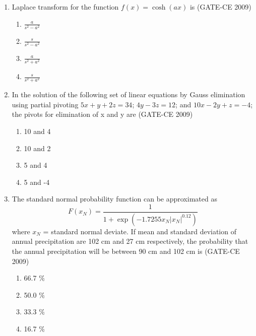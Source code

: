\documentclass[journal,12pt,onecolumn]{article}
\theoremstyle{remark}
\begin{document}
\begin{enumerate}
    \item Laplace transform for the function $f(x)=\cosh(ax)$ is (GATE-CE 2009)
    \begin{multicols}{2}
    \begin{enumerate}
        \item $\frac{a}{s^2-a^2}$ 
        \item $\frac{s}{s^2-a^2}$ 
        \item $\frac{a}{s^2+a^2}$ 
        \item $\frac{s}{s^2+a^2}$
    \end{enumerate}
    \end{multicols}
    
    \item In the solution of the following set of linear equations by Gauss elimination using partial pivoting  
    $5x+y+2z=34$;  $4y-3z=12$; and  $10x-2y+z=-4$; 
    the pivots for elimination of x and y are (GATE-CE 2009)
    \begin{multicols}{2}
    \begin{enumerate}
        \item 10 and 4 
        \item 10 and 2 
        \item 5 and 4 
        \item 5 and -4
    \end{enumerate}
    \end{multicols}
    
    \item The standard normal probability function can be approximated as
    \[ F(x_N) = \frac{1}{1+\exp\left(-1.7255 x_N | x_N |^{0.12}\right)} \]
    where $x_N$ = standard normal deviate. If mean and standard deviation of annual precipitation are 102 cm and 27 cm respectively, the probability that the annual precipitation will be between 90 cm and 102 cm is (GATE-CE 2009)
    \begin{multicols}{2}
    \begin{enumerate}
        \item 66.7 \% 
        \item 50.0 \% 
        \item 33.3 \% 
        \item 16.7 \%
    \end{enumerate}
    \end{multicols}
    

\end{enumerate}
\end{document}
